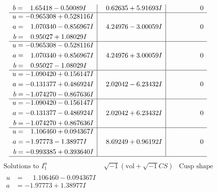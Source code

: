 \documentclass[1p]{elsarticle_modified}
\theoremstyle{definition}
\newcommand{\I}{\sqrt{-1}}
\begin{document}
$$\begin{array}{c|c|c}
\begin{aligned}
b &= \phantom{-}1.65418 - 0.50089 I\end{aligned}
 & \phantom{-}0.62635 + 5.91693 I & \phantom{-0.000000 } 0 \\ \hline\begin{aligned}
u &= -0.965308 + 0.528116 I \\
a &= \phantom{-}1.070340 - 0.856967 I \\
b &= \phantom{-}0.95027 + 1.08029 I\end{aligned}
 & \phantom{-}4.24976 - 3.00059 I & \phantom{-0.000000 } 0 \\ \hline\begin{aligned}
u &= -0.965308 - 0.528116 I \\
a &= \phantom{-}1.070340 + 0.856967 I \\
b &= \phantom{-}0.95027 - 1.08029 I\end{aligned}
 & \phantom{-}4.24976 + 3.00059 I & \phantom{-0.000000 } 0 \\ \hline\begin{aligned}
u &= -1.090420 + 0.156147 I \\
a &= -0.131377 + 0.486924 I \\
b &= -1.074270 - 0.867636 I\end{aligned}
 & \phantom{-}2.02042 - 6.23432 I & \phantom{-0.000000 } 0 \\ \hline\begin{aligned}
u &= -1.090420 - 0.156147 I \\
a &= -0.131377 - 0.486924 I \\
b &= -1.074270 + 0.867636 I\end{aligned}
 & \phantom{-}2.02042 + 6.23432 I & \phantom{-0.000000 } 0 \\ \hline\begin{aligned}
u &= \phantom{-}1.106460 + 0.094367 I \\
a &= -1.97773 - 1.38977 I \\
b &= -0.993385 + 0.393640 I\end{aligned}
 & \phantom{-}8.69249 + 0.96192 I & \phantom{-0.000000 } 0\\
 \hline 
 \end{array}$$\newpage$$\begin{array}{c|c|c}  
\text{Solutions to }I^u_{1}& \I (\text{vol} + \sqrt{-1}CS) & \text{Cusp shape}\\
 \hline 
\begin{aligned}
u &= \phantom{-}1.106460 - 0.094367 I \\
a &= -1.97773 + 1.38977 I \\

\end{aligned}
\end{array}$$
\end{document}

